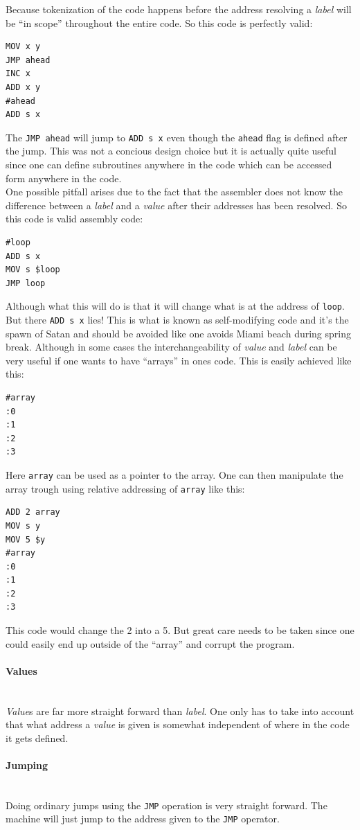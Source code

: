 \documentclass{article}
\newcommand{\V}{\verb}
\begin{document}
Because tokenization of the code happens before the address resolving a \emph{label}
will be ``in scope'' throughout the entire code. So this code is perfectly valid:

\begin{verbatim}
MOV x y
JMP ahead
INC x
ADD x y
#ahead
ADD s x
\end{verbatim}
The \V+JMP ahead+ will jump to \V+ADD s x+ even though the \V+ahead+ flag is
defined after the jump. This was not a concious design choice but it is actually
quite useful since one can define subroutines anywhere in the code which can be
accessed form anywhere in the code.\\
One possible pitfall arises due to the fact that the assembler does not know the
difference between a \emph{label} and a \emph{value} after their addresses has been resolved.
So this code is valid assembly code:
\begin{verbatim}
#loop
ADD s x
MOV s $loop
JMP loop
\end{verbatim}
Although what this will do is that it will change what is at the address of
\V+loop+. But there \V+ADD s x+ lies! This is what is known as self-modifying
code and it's the spawn of Satan and should be avoided like one avoids Miami
beach during spring break. Although in some cases the interchangeability of
\emph{value} and \emph{label} can be very useful if one wants to have ``arrays'' in ones
code. This is easily achieved like this:
\begin{verbatim}
#array
:0
:1
:2
:3
\end{verbatim}
Here \V+array+ can be used as a pointer to the array. One can then manipulate
the array trough using relative addressing of \V+array+ like this:
\begin{verbatim}
ADD 2 array
MOV s y
MOV 5 $y
#array
:0
:1
:2
:3
\end{verbatim}
This code would change the 2 into a 5. But great care needs to be taken since
one could easily end up outside of the ``array'' and corrupt the program.

\paragraph{Values} \
\\
\emph{Value}s are far more straight forward than \emph{label}. One only has to
take into account that what address a \emph{value} is given is somewhat
independent of where in the code it gets defined.

\paragraph{Jumping} \
\\
Doing ordinary jumps using the \V+JMP+ operation is very straight forward. The
machine will just jump to the address given to the \V+JMP+ operator.
\end{document}
